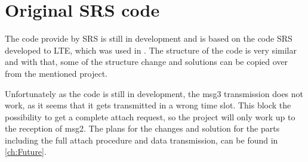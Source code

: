 




\section{Original SRS code}
The code provide by SRS is still in development and is based on the code SRS developed to LTE, which was used in \citep{thesis_report}. The structure of the code is very similar and with that, some of the structure change and solutions can be copied over from the mentioned project.

Unfortunately as the code is still in development, the msg3 transmission does not work, as it seems that it gets transmitted in a wrong time slot.  This block the possibility to get a complete attach request, so the project will only work up to the reception of msg2. The plans for the changes and solution for the parts including the full attach procedure and data transmission, can be found in \autoref{ch:Future}.

